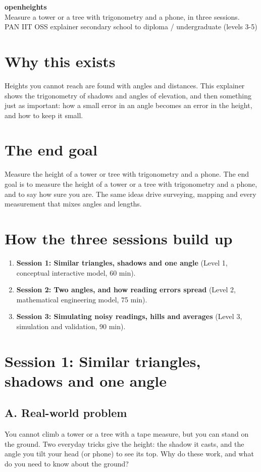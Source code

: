 \documentclass[11pt,a4paper]{article}
\begin{document}
\begin{center}{\LARGE\bfseries openheights}\\[0.4em]{\large Measure a tower or a tree with trigonometry and a phone, in three sessions.}\\[0.2em]\small PAN IIT OSS explainer \textbullet{} secondary school to diploma / undergraduate (levels 3-5)\end{center}

\section*{Why this exists}
Heights you cannot reach are found with angles and distances. This explainer shows the trigonometry of shadows and angles of elevation, and then something just as important: how a small error in an angle becomes an error in the height, and how to keep it small.

\section*{The end goal}
Measure the height of a tower or tree with trigonometry and a phone. The end goal is to measure the height of a tower or a tree with trigonometry and a phone, and to say how sure you are. The same ideas drive surveying, mapping and every measurement that mixes angles and lengths.

\section*{How the three sessions build up}
\begin{enumerate}[nosep]
\item \textbf{Session 1: Similar triangles, shadows and one angle} (Level 1, conceptual interactive model, 60 min).
\item \textbf{Session 2: Two angles, and how reading errors spread} (Level 2, mathematical engineering model, 75 min).
\item \textbf{Session 3: Simulating noisy readings, hills and averages} (Level 3, simulation and validation, 90 min).
\end{enumerate}

\section{Session 1: Similar triangles, shadows and one angle}

\subsection*{A. Real-world problem}
You cannot climb a tower or a tree with a tape measure, but you can stand on the ground. Two everyday tricks give the height: the shadow it casts, and the angle you tilt your head (or phone) to see its top. Why do these work, and what do you need to know about the ground?
\end{document}
